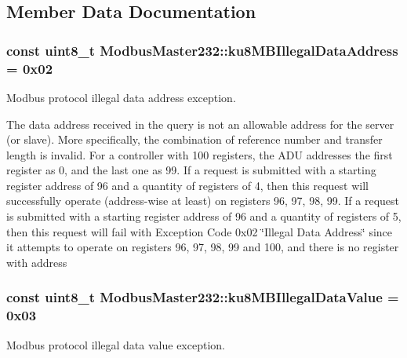 \subsection{Member Data Documentation}
\subsubsection[{\texorpdfstring{ku8\+M\+B\+Illegal\+Data\+Address}{ku8MBIllegalDataAddress}}]{\setlength{\rightskip}{0pt plus 5cm}const uint8\+\_\+t Modbus\+Master232\+::ku8\+M\+B\+Illegal\+Data\+Address = 0x02\hspace{0.3cm}{\ttfamily [static]}}\hypertarget{class_modbus_master232_a6ded76cb0e4f4a1b300fd18cf82f59da}{}\label{class_modbus_master232_a6ded76cb0e4f4a1b300fd18cf82f59da}
Modbus protocol illegal data address exception.

The data address received in the query is not an allowable address for the server (or slave). More specifically, the combination of reference number and transfer length is invalid. For a controller with 100 registers, the A\+DU addresses the first register as 0, and the last one as 99. If a request is submitted with a starting register address of 96 and a quantity of registers of 4, then this request will successfully operate (address-\/wise at least) on registers 96, 97, 98, 99. If a request is submitted with a starting register address of 96 and a quantity of registers of 5, then this request will fail with Exception Code 0x02 \char`\"{}\+Illegal Data Address\char`\"{} since it attempts to operate on registers 96, 97, 98, 99 and 100, and there is no register with address
\begin{DoxyEnumerate}
\item 
\end{DoxyEnumerate}
\subsubsection[{\texorpdfstring{ku8\+M\+B\+Illegal\+Data\+Value}{ku8MBIllegalDataValue}}]{\setlength{\rightskip}{0pt plus 5cm}const uint8\+\_\+t Modbus\+Master232\+::ku8\+M\+B\+Illegal\+Data\+Value = 0x03\hspace{0.3cm}{\ttfamily [static]}}\hypertarget{class_modbus_master232_ab7cc8568ac2defaf240b2e28e7768a95}{}\label{class_modbus_master232_ab7cc8568ac2defaf240b2e28e7768a95}
Modbus protocol illegal data value exception.

